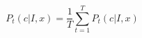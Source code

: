 \begin{equation}
P_{t}(c|I,x) = \frac{1}{T} \sum_{t=1}^{T} P_{t}(c|I,x)
\label{eq:ni:decision}
\end{equation}